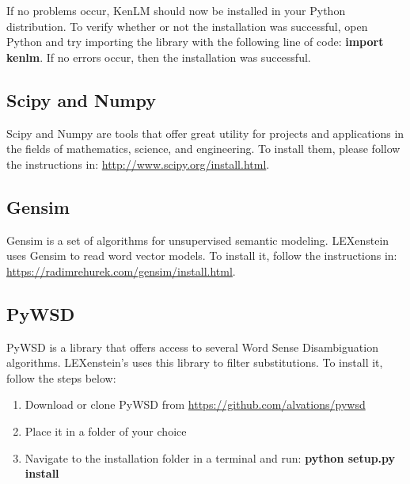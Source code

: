 If no problems occur, KenLM should now be installed in your Python distribution. To verify whether or not the installation was successful, open Python and try importing the library with the following line of code: \textbf{import kenlm}. If no errors occur, then the installation was successful.







\subsection{Scipy and Numpy}

Scipy and Numpy \cite{scipy} are tools that offer great utility for projects and applications in the fields of mathematics, science, and engineering. To install them, please follow the instructions in: \url{http://www.scipy.org/install.html}.







\subsection{Gensim}

Gensim \cite{gensim} is a set of algorithms for unsupervised semantic modeling. LEXenstein uses Gensim to read word vector models. To install it, follow the instructions in: \url{https://radimrehurek.com/gensim/install.html}.







\subsection{PyWSD}

PyWSD \cite{pywsd} is a library that offers access to several Word Sense Disambiguation algorithms. LEXenstein's uses this library to filter substitutions. To install it, follow the steps below:

\begin{enumerate}
	\item Download or clone PyWSD from \url{https://github.com/alvations/pywsd}
	\item Place it in a folder of your choice
	\item Navigate to the installation folder in a terminal and run: \textbf{python setup.py install}
\end{enumerate}

